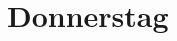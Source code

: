 \documentclass{uebung_cs}
\begin{document}
\section*{Donnerstag}
\begin{aufgabe}

\end{aufgabe}

\begin{aufgabe}[Balance]
    
\end{aufgabe}

\begin{aufgabe}
    
\end{aufgabe}
\end{document}
